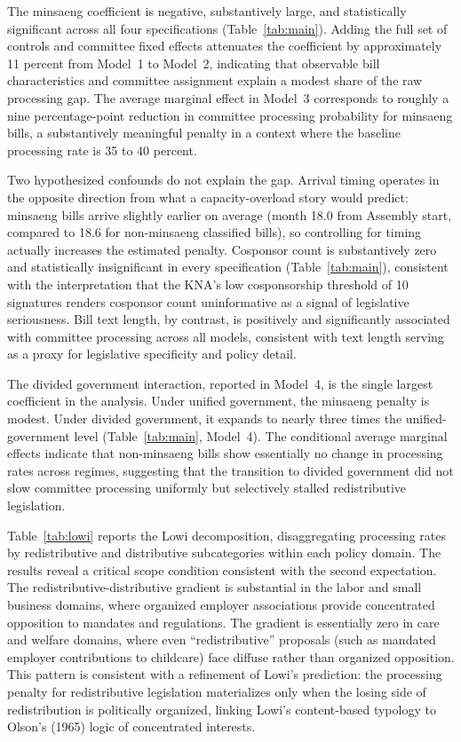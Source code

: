\documentclass[11pt]{article}
\begin{document}
The minsaeng coefficient is negative, substantively large, and statistically significant across all four specifications (Table~\ref{tab:main}). Adding the full set of controls and committee fixed effects attenuates the coefficient by approximately 11 percent from Model~1 to Model~2, indicating that observable bill characteristics and committee assignment explain a modest share of the raw processing gap. The average marginal effect in Model~3 corresponds to roughly a nine percentage-point reduction in committee processing probability for minsaeng bills, a substantively meaningful penalty in a context where the baseline processing rate is 35 to 40 percent.

Two hypothesized confounds do not explain the gap. Arrival timing operates in the opposite direction from what a capacity-overload story would predict: minsaeng bills arrive slightly earlier on average (month 18.0 from Assembly start, compared to 18.6 for non-minsaeng classified bills), so controlling for timing actually increases the estimated penalty. Cosponsor count is substantively zero and statistically insignificant in every specification (Table~\ref{tab:main}), consistent with the interpretation that the KNA's low cosponsorship threshold of 10 signatures renders cosponsor count uninformative as a signal of legislative seriousness. Bill text length, by contrast, is positively and significantly associated with committee processing across all models, consistent with text length serving as a proxy for legislative specificity and policy detail.

The divided government interaction, reported in Model~4, is the single largest coefficient in the analysis. Under unified government, the minsaeng penalty is modest. Under divided government, it expands to nearly three times the unified-government level (Table~\ref{tab:main}, Model~4). The conditional average marginal effects indicate that non-minsaeng bills show essentially no change in processing rates across regimes, suggesting that the transition to divided government did not slow committee processing uniformly but selectively stalled redistributive legislation.

Table~\ref{tab:lowi} reports the Lowi decomposition, disaggregating processing rates by redistributive and distributive subcategories within each policy domain. The results reveal a critical scope condition consistent with the second expectation. The redistributive-distributive gradient is substantial in the labor and small business domains, where organized employer associations provide concentrated opposition to mandates and regulations. The gradient is essentially zero in care and welfare domains, where even ``redistributive'' proposals (such as mandated employer contributions to childcare) face diffuse rather than organized opposition. This pattern is consistent with a refinement of Lowi's prediction: the processing penalty for redistributive legislation materializes only when the losing side of redistribution is politically organized, linking Lowi's content-based typology to Olson's (1965) logic of concentrated interests.
\end{document}
